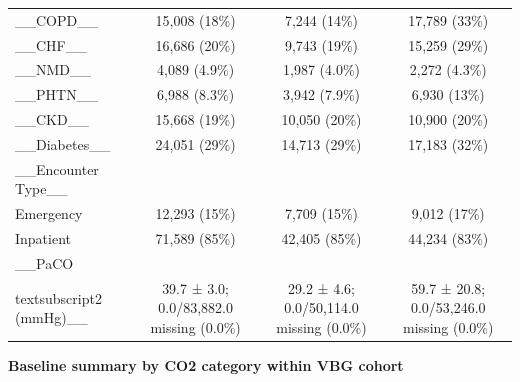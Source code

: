 \documentclass[
  11pt,
  letterpaper,
  DIV=11,
  numbers=noendperiod]{scrartcl}
\begin{document}
\begin{longtable*}{>{\raggedright\arraybackslash}p{2.0in}ccc}
\addlinespace
\_\_COPD\_\_ & 15,008 (18\%) & 7,244 (14\%) & 17,789 (33\%)\\
\_\_CHF\_\_ & 16,686 (20\%) & 9,743 (19\%) & 15,259 (29\%)\\
\_\_NMD\_\_ & 4,089 (4.9\%) & 1,987 (4.0\%) & 2,272 (4.3\%)\\
\_\_PHTN\_\_ & 6,988 (8.3\%) & 3,942 (7.9\%) & 6,930 (13\%)\\
\_\_CKD\_\_ & 15,668 (19\%) & 10,050 (20\%) & 10,900 (20\%)\\
\addlinespace
\_\_Diabetes\_\_ & 24,051 (29\%) & 14,713 (29\%) & 17,183 (32\%)\\
\_\_Encounter Type\_\_ &  &  & \\
Emergency & 12,293 (15\%) & 7,709 (15\%) & 9,012 (17\%)\\
Inpatient & 71,589 (85\%) & 42,405 (85\%) & 44,234 (83\%)\\
\_\_PaCO\\textsubscript{2} (mmHg)\_\_ & 39.7 ± 3.0; 0.0/83,882.0 missing (0.0\%) & 29.2 ± 4.6; 0.0/50,114.0 missing (0.0\%) & 59.7 ± 20.8; 0.0/53,246.0 missing (0.0\%)\\*
\end{longtable*}

\endgroup{}

\begin{center}\textbf{Baseline summary by CO2 category within VBG cohort}\end{center}

\begingroup\fontsize{7}{9}\selectfont
\end{document}
